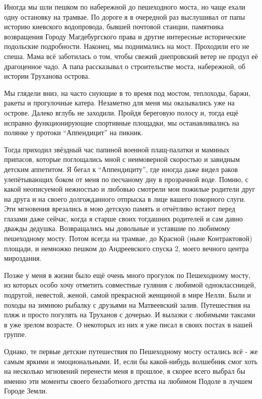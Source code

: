 Иногда мы шли пешком по набережной до пешеходного моста, но чаще ехали одну
остановку на трамвае. По дороге я в очередной раз выслушивал от папы историю
киевского водопровода, бывшей почтовой станции, памятника возвращения Городу
Магдебургского права и другие интересные исторические подольские подробности.
Наконец, мы поднимались на мост. Проходили его не спеша. Мама всё заботилась о
том, чтобы свежий днепровский ветер не продул её драгоценное чадо. А папа
рассказывал о строительстве моста, набережной, об истории Труханова острова. 

Мы глядели вниз, на часто снующие в то время под мостом, теплоходы, баржи,
ракеты и прогулочные катера. Незаметно для меня мы оказывались уже на острове.
Далеко вглубь не заходили. Пройдя береговую полосу и, тогда ещё исправно
функционирующие спортивные площадки, мы останавливались на полянке у протоки
\enquote{Аппендицит} на пикник. 

Тогда приходил звёздный час папиной военной плащ-палатки и маминых припасов,
которые поглощались мной с неимоверной скоростью и завидным детским аппетитом.
Я бегал к \enquote{Аппендициту}, где иногда даже видел раков улепётывающих
боком от меня по песчаному дну в прозрачной воде. Помню, с какой неописуемой
нежностью и любовью смотрели мои пожилые родители друг на друга и на своего
долгожданного отпрыска в лице вашего покорного слуги. Эти мгновения врезались в
мою детскую память и отчётливо встают перед глазами даже сейчас, когда я старше
своих тогдашних родителей и сам давно дважды дедушка. Возвращались мы довольные
и уставшие по любимому пешеходному мосту. Потом всегда на трамвае, до Красной
(ныне Контрактовой) площади, и немножко пешком до Андреевского спуска 2, моего
вечного центра мироздания. 

Позже у меня в жизни было ещё очень много прогулок по Пешеходному мосту, из
которых особо хочу отметить совместные гуляния с любимой одноклассницей,
подругой, невестой, женой, самой прекрасной женщиной в мире Нелли. Были и
походы на зимнюю рыбалку с друзьями на Матвеевский залив.  Путешествия на пляж
и просто погулять на Труханов с дочерью. И вылазки с любимыми таксами в уже
зрелом возрасте. О некоторых из них я уже писал в своих постах в нашей группе. 

Однако, те первые детские путешествия по Пешеходному мосту остались всё - же
самым яркими и эмоциональными. И, если бы какой-нибудь волшебник смог хоть на
несколько мгновений перенести меня в прошлое, я скорее всего выбрал бы именно
эти моменты своего беззаботного детства на любимом Подоле в лучшем Городе
Земли.

